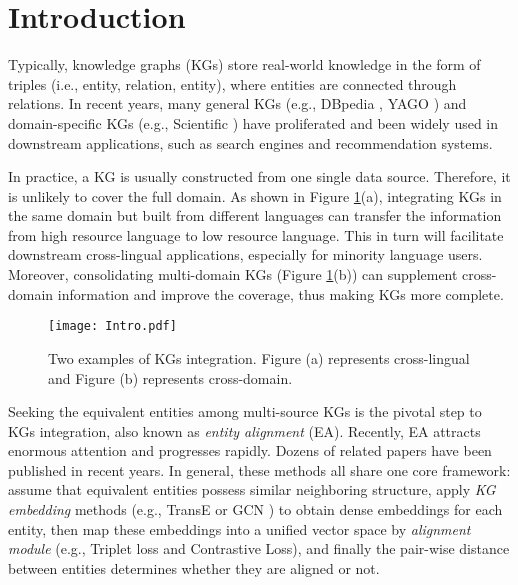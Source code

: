 \documentclass[sigconf]{acmart}
\begin{document}


\maketitle

\section{Introduction}
\label{sec:intro}
Typically, knowledge graphs (KGs) store real-world knowledge in the form of triples (i.e., entity, relation, entity), where entities are connected through relations.
In recent years, many general KGs (e.g., DBpedia \cite{DBLP:conf/semweb/AuerBKLCI07}, YAGO \cite{DBLP:conf/www/SuchanekKW07}) and domain-specific KGs (e.g., Scientific \cite{DBLP:conf/kdd/TangZYLZS08}) have proliferated
and been widely used in downstream applications, such as search engines and recommendation systems.

In practice, a KG is usually constructed from one single data source.
Therefore, it is unlikely to cover the full domain.
As shown in Figure \ref{Figure:Intro}(a), integrating KGs in the same domain but built from different languages can transfer the information from high resource language to low resource language.
This in turn will facilitate downstream cross-lingual applications, especially for minority language users.
Moreover, consolidating multi-domain KGs (Figure \ref{Figure:Intro}(b)) can supplement cross-domain information and improve the coverage, thus making KGs more complete.

\begin{figure}
  \centering
  \texttt{[image: Intro.pdf]}
  \caption{Two examples of KGs integration. Figure (a) represents cross-lingual and Figure (b) represents cross-domain.}\label{Figure:Intro}
\end{figure}

Seeking the equivalent entities among multi-source KGs is the pivotal step to KGs integration, also known as \emph{entity alignment} (EA).
Recently, EA attracts enormous attention and progresses rapidly.
Dozens of related papers have been published in recent years.
In general, these methods all share one core framework:
assume that equivalent entities possess similar neighboring structure, apply \emph{KG embedding} methods (e.g., TransE \cite{DBLP:conf/nips/BordesUGWY13} or GCN \cite{DBLP:journals/corr/KipfW16}) to obtain dense embeddings for each entity, then map these embeddings into a unified vector space by \emph{alignment module} (e.g., Triplet loss and Contrastive Loss\cite{DBLP:conf/cvpr/SchroffKP15,DBLP:conf/cvpr/HadsellCL06}),
and finally the pair-wise distance between entities determines whether they are aligned or not.
\end{document}
